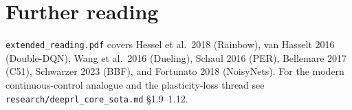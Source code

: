 \documentclass[11pt,oneside]{scrbook}
\begin{document}
\chapter{Further reading}

\texttt{extended\_reading.pdf} covers Hessel et al.\ 2018 (Rainbow), van Hasselt 2016
(Double-DQN), Wang et al.\ 2016 (Dueling), Schaul 2016 (PER), Bellemare 2017 (C51),
Schwarzer 2023 (BBF), and Fortunato 2018 (NoisyNets). For the modern continuous-control
analogue and the plasticity-loss thread see \texttt{research/deeprl\_core\_sota.md}
\S1.9--1.12.
\end{document}
